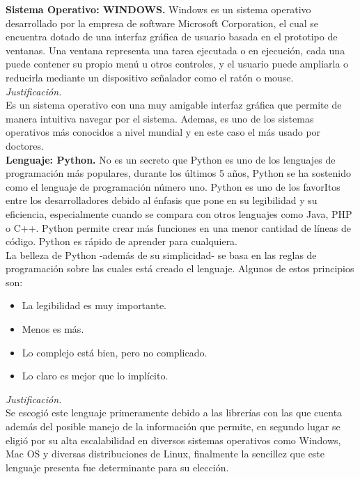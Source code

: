 \documentclass[12pt]{report}
\begin{document}
\textbf{Sistema Operativo: WINDOWS. }
Windows es un sistema operativo desarrollado por la empresa de software Microsoft Corporation, el cual se encuentra dotado de una interfaz gráfica de usuario basada en el prototipo de ventanas. Una ventana representa una tarea ejecutada o en ejecución, cada una puede contener su propio menú u otros controles, y el usuario puede ampliarla o reducirla mediante un dispositivo señalador como el ratón o mouse.\\

\textit{Justificación.}\\Es un sistema operativo con una muy amigable interfaz gráfica que permite de manera intuitiva navegar por el sistema. Ademas, es uno de los sistemas operativos más conocidos a nivel mundial y en este caso el más usado por doctores.\\

\textbf{Lenguaje: Python.}
No es un secreto que Python es uno de los lenguajes de programación más populares, durante los últimos 5 años, Python se ha sostenido como el lenguaje de programación número uno. Python es uno de los favorItos entre los desarrolladores debido al énfasis que pone en su legibilidad y su eficiencia, especialmente cuando se compara con otros lenguajes como Java, PHP o C++. Python permite crear más funciones en una menor cantidad de líneas de código. Python es rápido de aprender para cualquiera.\\

La belleza de Python -además de su simplicidad- se basa en las reglas de programación sobre las cuales está creado el lenguaje. Algunos de estos principios son:
\begin{itemize}
\item La legibilidad es muy importante.
\item Menos es más.
\item Lo complejo está bien, pero no complicado.
\item Lo claro es mejor que lo implícito.
\end{itemize}

\textit{Justificación.}\\ Se escogió este lenguaje primeramente debido a las librerías con las que cuenta además del posible manejo de la información que permite, en segundo lugar se eligió por su alta escalabilidad en diversos sistemas operativos como Windows, Mac OS y diversas distribuciones de Linux, finalmente la sencillez que este lenguaje presenta fue determinante para su elección.\\
\end{document}
